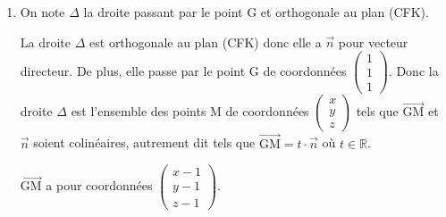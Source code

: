 \documentclass[10pt]{article}
\providecommand{\R}{\mathbb{R}}
\providecommand{\vect}[1]{\overrightarrow{#1}}
\providecommand{\vectt}[1]{\overrightarrow{\mathrm{#1}}}
\begin{document}
\begin{enumerate}
\begin{enumerate}
Le vecteur $\vect{n}$ est donc orthogonal à deux vecteurs directeurs du plan (CFK) donc c'est un vecteur normal au plan (CFK).

		\item  
Le plan (CFK) est l'ensemble des points M de coordonnées
$\begin{pmatrix}
x \\ y \\ z
\end{pmatrix}$
tels que $\vectt{CM}$ et $\vect{n}$ soient orthogonaux, c'est-à-dire tels que $\vectt{CM}\cdot\vect{n}=0$.

$\vectt{CM}$ a pour coordonnées 
$\begin{pmatrix}
x-1 \\ y-1 \\ z
\end{pmatrix}$.

$\begin{gathered}\vectt{CM}\cdot\vect{n}=0
\iff
(x-1)\times 1 + (y-1)\times 2 + z\times 1=0\\
\phantom{\vectt{CM}\cdot\vectt{n}=0}
\iff
x-1+2y-2+z=0
\iff
x+2y+z-3=0\end{gathered}$

Le plan (CFK) a donc pour équation cartésienne $x+2y+z-3=0$.

	\end{enumerate}
	
\item On note $\Delta$ la droite passant par le point G et orthogonale au plan (CFK). 








La droite $\Delta$ est orthogonale au plan (CFK) donc elle a $\vect{n}$ pour vecteur directeur.
De plus, elle passe par le point G de coordonnées
$\begin{pmatrix}
1 \\ 1 \\ 1
\end{pmatrix}$.
Donc la droite $\Delta$ est l'ensemble des points M de coordonnées
$\begin{pmatrix}
x \\ y \\ z
\end{pmatrix}$
tels que $\vectt{GM}$ et $\vect{n}$ soient colinéaires, autrement dit tels que $\vectt{GM}=t\cdot\vect{n}$ où $t\in\R$.

$\vectt{GM}$ a pour coordonnées 
$\begin{pmatrix}
x-1 \\ y-1 \\ z-1
\end{pmatrix}$.


\end{enumerate}
\end{document}
